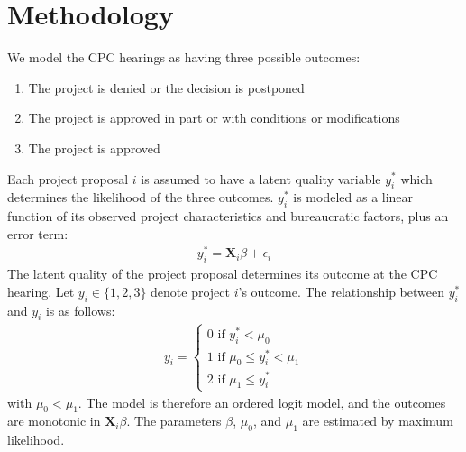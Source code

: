 \section{Methodology}\label{sec_methodology}

We model the CPC hearings as having three possible outcomes:
\begin{enumerate}[start=0]
\item The project is denied or the decision is postponed
\item The project is approved in part or with conditions or modifications
\item The project is approved
\end{enumerate}
Each project proposal $i$ is assumed to have a latent quality variable $y_i^\ast$ which determines the likelihood of the three outcomes. $y_i^\ast$ is modeled as a linear function of its observed project characteristics and bureaucratic factors, plus an error term:
\begin{align}
y_i^\ast = \mathbf{X}_i \beta + \epsilon_i
\end{align}
The latent quality of the project proposal determines its outcome at the CPC hearing. Let $y_{i} \in \{1, 2, 3\}$ denote project $i$'s outcome. The relationship between $y_i^\ast$ and $y_i$ is as follows:
\begin{align}
y_i = \begin{cases}
0 \text{ if } y_i^\ast < \mu_0 \\
1 \text{ if } \mu_0 \leq y_i^\ast < \mu_1 \\
2 \text{ if } \mu_1 \leq y_i^\ast
\end{cases}
\end{align}
with $\mu_0 < \mu_1$. The model is therefore an ordered logit model, and the outcomes are monotonic in $\mathbf{X}_i \beta$. The parameters $\beta$, $\mu_0$, and $\mu_1$ are estimated by maximum likelihood.



